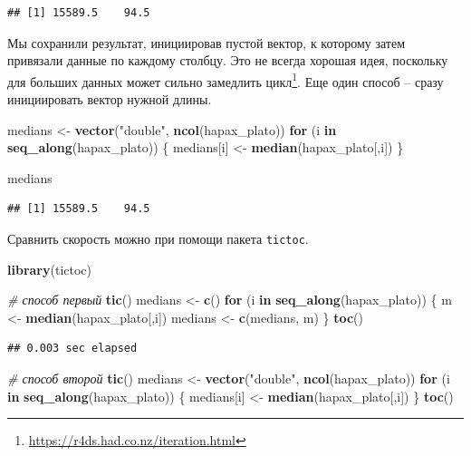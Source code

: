 \documentclass[
]{book}
\newenvironment{Shaded}{\begin{snugshade}}{\end{snugshade}}
\newcommand{\CommentTok}[1]{\textcolor[rgb]{0.56,0.35,0.01}{\textit{#1}}}
\newcommand{\ControlFlowTok}[1]{\textcolor[rgb]{0.13,0.29,0.53}{\textbf{#1}}}
\newcommand{\FunctionTok}[1]{\textcolor[rgb]{0.13,0.29,0.53}{\textbf{#1}}}
\newcommand{\NormalTok}[1]{#1}
\newcommand{\OtherTok}[1]{\textcolor[rgb]{0.56,0.35,0.01}{#1}}
\newcommand{\StringTok}[1]{\textcolor[rgb]{0.31,0.60,0.02}{#1}}
\theoremstyle{definition}
\theoremstyle{definition}
\theoremstyle{definition}
\theoremstyle{definition}
\theoremstyle{remark}
\begin{document}
\begin{verbatim}
## [1] 15589.5    94.5
\end{verbatim}

Мы сохранили результат, инициировав пустой вектор, к которому затем привязали данные по каждому столбцу. Это не всегда хорошая идея, поскольку для больших данных может сильно замедлить цикл\footnote{\url{https://r4ds.had.co.nz/iteration.html}}. Еще один способ -- сразу инициировать вектор нужной длины.

\begin{Shaded}
\begin{Highlighting}[]
\NormalTok{medians }\OtherTok{\textless{}{-}} \FunctionTok{vector}\NormalTok{(}\StringTok{"double"}\NormalTok{, }\FunctionTok{ncol}\NormalTok{(hapax\_plato))}
\ControlFlowTok{for}\NormalTok{ (i }\ControlFlowTok{in} \FunctionTok{seq\_along}\NormalTok{(hapax\_plato)) \{ }
\NormalTok{  medians[i] }\OtherTok{\textless{}{-}} \FunctionTok{median}\NormalTok{(hapax\_plato[,i])}
\NormalTok{\}}

\NormalTok{medians}
\end{Highlighting}
\end{Shaded}

\begin{verbatim}
## [1] 15589.5    94.5
\end{verbatim}

Сравнить скорость можно при помощи пакета \texttt{tictoc}.

\begin{Shaded}
\begin{Highlighting}[]
\FunctionTok{library}\NormalTok{(tictoc)}

\CommentTok{\# способ первый }
\FunctionTok{tic}\NormalTok{()}
\NormalTok{medians }\OtherTok{\textless{}{-}} \FunctionTok{c}\NormalTok{()}
\ControlFlowTok{for}\NormalTok{ (i }\ControlFlowTok{in} \FunctionTok{seq\_along}\NormalTok{(hapax\_plato)) \{ }
\NormalTok{  m }\OtherTok{\textless{}{-}} \FunctionTok{median}\NormalTok{(hapax\_plato[,i])}
\NormalTok{  medians }\OtherTok{\textless{}{-}} \FunctionTok{c}\NormalTok{(medians, m)}
\NormalTok{\}}
\FunctionTok{toc}\NormalTok{()}
\end{Highlighting}
\end{Shaded}

\begin{verbatim}
## 0.003 sec elapsed
\end{verbatim}

\begin{Shaded}
\begin{Highlighting}[]
\CommentTok{\# способ второй}
\FunctionTok{tic}\NormalTok{()}
\NormalTok{medians }\OtherTok{\textless{}{-}} \FunctionTok{vector}\NormalTok{(}\StringTok{"double"}\NormalTok{, }\FunctionTok{ncol}\NormalTok{(hapax\_plato))}
\ControlFlowTok{for}\NormalTok{ (i }\ControlFlowTok{in} \FunctionTok{seq\_along}\NormalTok{(hapax\_plato)) \{ }
\NormalTok{  medians[i] }\OtherTok{\textless{}{-}} \FunctionTok{median}\NormalTok{(hapax\_plato[,i])}
\NormalTok{\}}
\FunctionTok{toc}\NormalTok{()}
\end{Highlighting}
\end{Shaded}
\end{document}
